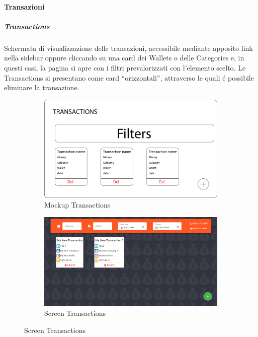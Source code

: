 \documentclass{report}
\begin{document}
\paragraph{Transazioni}
\subparagraph{Transactions}
Schermata di visualizzazione delle transazioni, accessibile mediante apposito link nella sidebar oppure cliccando su una card dei Wallets o delle Categories e, in questi casi, la pagina si apre con i filtri prevalorizzati con l’elemento scelto. Le Transactions si presentano come card “orizzontali”, attraverso le quali é possibile eliminare la transazione.
\begin{figure}[H]
    \begin{subfigure}
        \centering
        \includegraphics[scale=0.3]{images/mockups/Transactions.png}
        \caption{Mockup Transactions}
    \end{subfigure}
    \par\bigskip
    \begin{subfigure}
        \centering
        \includegraphics[scale=0.35]{images/screens/Transactions.png}
        \caption{Screen Transactions}
    \end{subfigure}
\end{figure}
\end{document}
